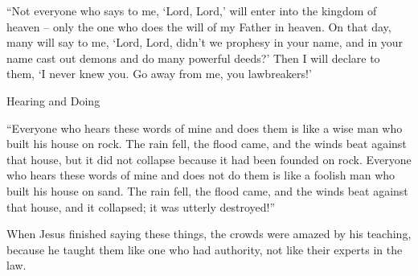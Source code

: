 {\par }{\PP {}“Not
everyone
who says
to me,
‘Lord,
Lord,’
will enter
into
the kingdom
of heaven
– only
the one who does
the will
of my
Father
in
heaven.
On
that
day,
many
will
say
to me,
‘Lord,
Lord,
didn’t
we prophesy
in your
name,
and
in your
name
cast out
demons
and
do
many
powerful deeds?’
Then
I will declare
to them,
‘I
never
knew
you.
Go away
from
me,
you lawbreakers!’
\par }{\SH Hearing and Doing
\par }{\PP {}“Everyone
who
hears
these
words
of mine
and
does
them
is like
a wise
man
who
built
his
house
on
rock.
The rain
fell,
the flood
came,
and
the winds
beat
against that house,
but it
did not
collapse
because
it had been founded
on
rock.
Everyone
who hears
these
words
of mine
and
does
not
do
them
is like
a foolish
man
who
built
his
house
on
sand.
The rain
fell,
the flood
came,
and
the winds
beat
against that
house,
and
it collapsed;
it was
utterly destroyed!”
\par }{\PP {}When
Jesus
finished
saying
these things,
the crowds
were amazed
by
his
teaching,
because
he
taught
them
like
one who had
authority,
not
like
their
experts in the law.

}
